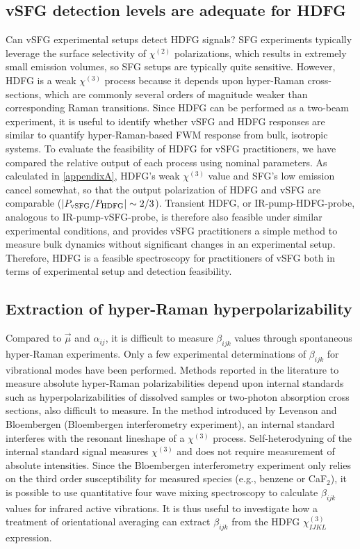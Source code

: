 \documentclass[aip, jcp, reprint, onecolumn, nofootinbib]{revtex4-2}
\begin{document}
\subsection{vSFG detection levels are adequate for HDFG}
Can vSFG experimental setups detect HDFG signals?
SFG experiments typically leverage the surface selectivity of $\chi^{(2)}$ polarizations, which results in extremely small emission volumes, so SFG setups are typically quite sensitive.
However, HDFG is a weak $\chi^{(3)}$ process because it depends upon hyper-Raman cross-sections, which are commonly several orders of magnitude weaker than corresponding Raman transitions.\cite{RN515}
Since HDFG can be performed as a two-beam experiment, it is useful to identify whether vSFG and HDFG responses are similar to quantify hyper-Raman-based FWM response from bulk, isotropic systems.
To evaluate the feasibility of HDFG for vSFG practitioners, we have compared the relative output of each process using nominal parameters. 
As calculated in \autoref{appendixA}, HDFG's weak $\chi^{(3)}$ value and SFG's low emission cancel somewhat, so that the output polarization of HDFG and vSFG are comparable ($\abs{P_\text{vSFG} / P_\text{HDFG}} \sim 2/3$).
Transient HDFG, or IR-pump-HDFG-probe, analogous to IR-pump-vSFG-probe, is therefore also feasible under similar experimental conditions, and provides vSFG practitioners a simple method to measure bulk dynamics without significant changes in an experimental setup. 
Therefore, HDFG is a feasible spectroscopy for practitioners of vSFG both in terms of experimental setup and detection feasibility.


\subsection{Extraction of hyper-Raman hyperpolarizability}

Compared to $\vec{\mu}$ and $\alpha_{ij}$, it is difficult to measure $\beta_{ijk}$ values through spontaneous hyper-Raman experiments.\cite{Kelley2010}
Only a few experimental determinations of $\beta_{ijk}$ for vibrational modes have been performed.\cite{Xu1997, Shoute2005, Kelley2010}
Methods reported in the literature to measure absolute hyper-Raman polarizabilities depend upon internal standards such as hyperpolarizabilities of dissolved samples or two-photon absorption cross sections, also difficult to measure. \cite{Kelley2010} 
In the method introduced by Levenson and Bloembergen (Bloembergen interferometry experiment), an internal standard interferes with the resonant lineshape of a $\chi^{(3)}$ process. \cite{Levenson1974_1, Levenson1974_2}
Self-heterodyning of the internal standard signal measures $\chi^{(3)}$ and does not require measurement of absolute intensities. 
Since the Bloembergen interferometry experiment only relies on the third order susceptibility for measured species (e.g., benzene or CaF$_2$),\cite{Levenson1974_2} it is possible to use quantitative four wave mixing spectroscopy to calculate $\beta_{ijk}$ values for infrared active vibrations.
It is thus useful to investigate how a treatment of orientational averaging can extract $\beta_{ijk}$ from the HDFG $\chi^{(3)}_{IJKL}$ expression.
\end{document}
